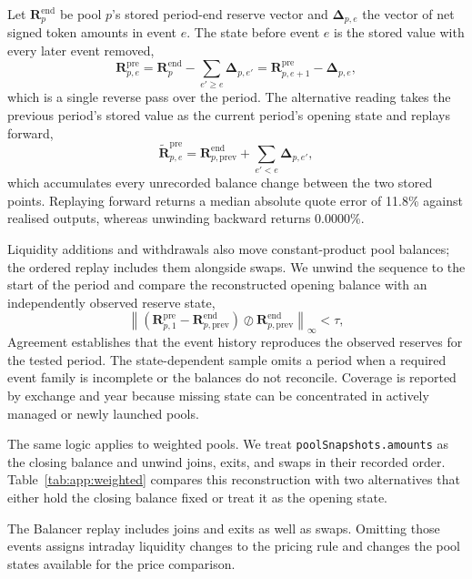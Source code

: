 Let $\mathbf R_p^{\mathrm{end}}$ be pool $p$'s stored period-end reserve vector and $\boldsymbol\Delta_{p,e}$ the vector of net signed token amounts in event $e$. The state before event $e$ is the stored value with every later event removed,
\[
\mathbf R^{\mathrm{pre}}_{p,e}=\mathbf R_p^{\mathrm{end}}-
\sum_{e'\ge e}\boldsymbol\Delta_{p,e'}
=\mathbf R^{\mathrm{pre}}_{p,e+1}-\boldsymbol\Delta_{p,e},
\]
which is a single reverse pass over the period. The alternative reading takes the previous period's stored value as the current period's opening state and replays forward,
\[
\widetilde{\mathbf R}^{\mathrm{pre}}_{p,e}=\mathbf R^{\mathrm{end}}_{p,\mathrm{prev}}+
\sum_{e'<e}\boldsymbol\Delta_{p,e'},
\]
which accumulates every unrecorded balance change between the two stored points. Replaying forward returns a median absolute quote error of 11.8\% against realised outputs, whereas unwinding backward returns 0.0000\%.

Liquidity additions and withdrawals also move constant-product pool balances; the ordered replay includes them alongside swaps. We unwind the sequence to the start of the period and compare the reconstructed opening balance with an independently observed reserve state,
\[
\left\|\left(\mathbf R^{\mathrm{pre}}_{p,1}-\mathbf R^{\mathrm{end}}_{p,\mathrm{prev}}\right)
\oslash\mathbf R^{\mathrm{end}}_{p,\mathrm{prev}}\right\|_{\infty}<\tau,
\]
Agreement establishes that the event history reproduces the observed reserves for the tested period. The state-dependent sample omits a period when a required event family is incomplete or the balances do not reconcile. Coverage is reported by exchange and year because missing state can be concentrated in actively managed or newly launched pools.

The same logic applies to weighted pools. We treat \texttt{poolSnapshots.amounts} as the closing balance and unwind joins, exits, and swaps in their recorded order. Table~\ref{tab:app:weighted} compares this reconstruction with two alternatives that either hold the closing balance fixed or treat it as the opening state.

The Balancer replay includes joins and exits as well as swaps. Omitting those events assigns intraday liquidity changes to the pricing rule and changes the pool states available for the price comparison.

